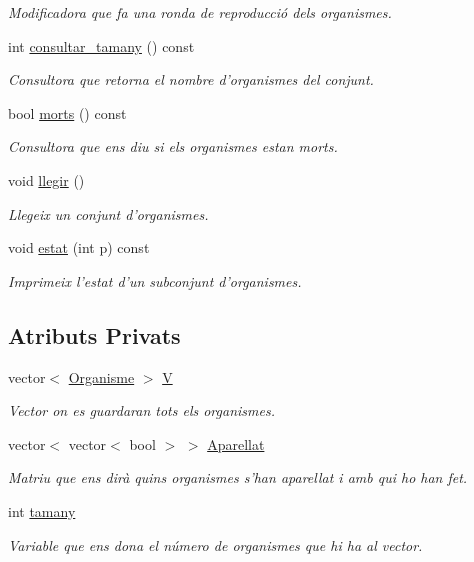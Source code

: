 \begin{DoxyCompactItemize}
\begin{DoxyCompactList}\small\item\em Modificadora que fa una ronda de reproducció dels organismes. \end{DoxyCompactList}\item 
int \hyperlink{class_conjunt_org_adbce2716cb543fa4d513c6d2a21b4fe1}{consultar\-\_\-tamany} () const 
\begin{DoxyCompactList}\small\item\em Consultora que retorna el nombre d'organismes del conjunt. \end{DoxyCompactList}\item 
bool \hyperlink{class_conjunt_org_aa250202ccc4d06ead8b11c9b26c2f28d}{morts} () const 
\begin{DoxyCompactList}\small\item\em Consultora que ens diu si els organismes estan morts. \end{DoxyCompactList}\item 
void \hyperlink{class_conjunt_org_aa933556b09efa171f23abed943fe78a7}{llegir} ()
\begin{DoxyCompactList}\small\item\em Llegeix un conjunt d'organismes. \end{DoxyCompactList}\item 
void \hyperlink{class_conjunt_org_a0c57d7702a556a7e9fe1a819414845a7}{estat} (int p) const 
\begin{DoxyCompactList}\small\item\em Imprimeix l'estat d'un subconjunt d'organismes. \end{DoxyCompactList}\end{DoxyCompactItemize}
\subsection*{Atributs Privats}
\begin{DoxyCompactItemize}
\item 
vector$<$ \hyperlink{class_organisme}{Organisme} $>$ \hyperlink{class_conjunt_org_adab11e0ac8295072ec682716478a535a}{V}
\begin{DoxyCompactList}\small\item\em Vector on es guardaran tots els organismes. \end{DoxyCompactList}\item 
vector$<$ vector$<$ bool $>$ $>$ \hyperlink{class_conjunt_org_a9782fdb4c89e8dd61762453de8f77fcb}{Aparellat}
\begin{DoxyCompactList}\small\item\em Matriu que ens dirà quins organismes s'han aparellat i amb qui ho han fet. \end{DoxyCompactList}\item 
int \hyperlink{class_conjunt_org_a468e7686498561628ad731ea196df8b5}{tamany}
\begin{DoxyCompactList}\small\item\em Variable que ens dona el número de organismes que hi ha al vector. \end{DoxyCompactList}\end{DoxyCompactItemize}


